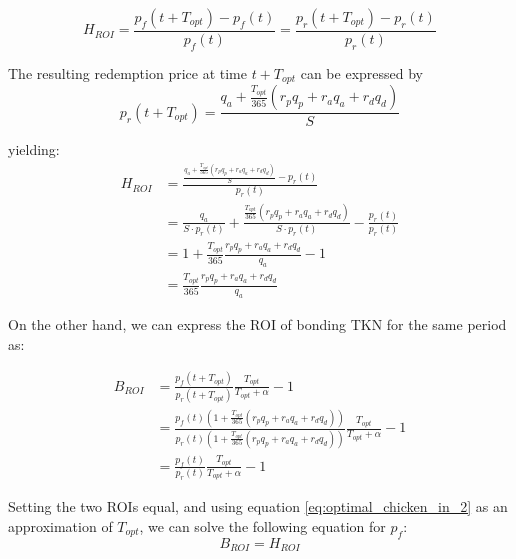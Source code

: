 \documentclass{article}
\begin{document}
\begin{equation}
  \label{eq:ROI-eq}
  H_{ROI} = \frac{p_f(t + T_{opt}) - p_f(t)}{p_f(t)} = \frac{p_r(t + T_{opt}) - p_r(t)}{p_r(t)}
\end{equation}

The resulting redemption price at time $t + T_{opt}$ can be expressed by
\begin{equation}
  \label{eq:redemption-price}
    p_r(t + T_{opt}) = \frac{q_a + \frac{T_{opt}}{365} (r_p q_p + r_a q_a + r_d q_d)}{S}
\end{equation}

yielding:
\begin{equation}
  \label{eq:ROI-eq2}
  \begin{split}
    H_{ROI} & = \frac{\frac{q_a + \frac{T_{opt}}{365} (r_p q_p + r_a q_a + r_d q_d)}{S} - p_r(t)}{p_r(t)} \\
    & = \frac{q_a}{S \cdot p_r(t)} + \frac{\frac{T_{opt}}{365} (r_p q_p + r_a q_a + r_d q_d)}{S\cdot p_r(t)} - \frac{p_r(t)}{p_r(t)} \\
    & = 1 + \frac{T_{opt}}{365} \frac{r_p q_p + r_a q_a + r_d q_d}{q_a} - 1 \\
    & = \frac{T_{opt}}{365} \frac{r_p q_p + r_a q_a + r_d q_d}{q_a}
  \end{split}
\end{equation}

On the other hand, we can express the ROI of bonding TKN for the same period as:

\begin{equation}
  \label{eq:ROI-bonding}
  \begin{split}
    B_{ROI} & = \frac{p_f(t+T_{opt})}{p_r(t+T_{opt})}\frac{T_{opt}}{T_{opt}+\alpha} - 1 \\
    & = \frac{p_f(t)(1 + \frac{T_{opt}}{365} (r_p q_p + r_a q_a + r_d q_d))} {p_r(t)(1 + \frac{T_{opt}}{365} (r_p q_p + r_a q_a + r_d q_d))}    \frac{T_{opt}}{T_{opt}+\alpha} - 1 \\ 
    & = \frac{p_f(t)}{p_r(t)}\frac{T_{opt}}{T_{opt}+\alpha} - 1
  \end{split}
\end{equation}

Setting the two ROIs equal, and using equation \ref{eq:optimal_chicken_in_2} as an approximation of $T_{opt}$, we can solve the following equation for $p_f$:
\begin{equation}
  \label{eq:ROI-bonding-holding}
  B_{ROI} = H_{ROI}
\end{equation}
\end{document}
